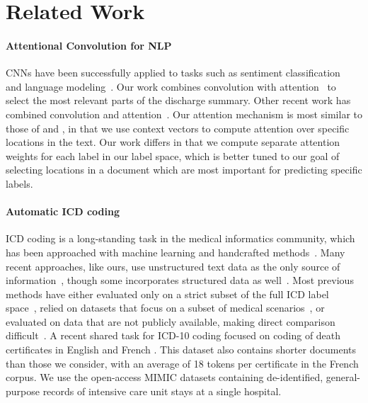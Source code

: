\documentclass[11pt,a4paper]{article}
\begin{document}
\section{Related Work}

\paragraph{Attentional Convolution for NLP}

CNNs have been successfully applied to tasks such as sentiment classification~\cite{kim2014convolutional} and language modeling~\cite{dauphin2016language}. Our work combines convolution with attention~\cite{bahdanau2014neural,yang2016hierarchical} to select the most relevant parts of the discharge summary. Other recent work has combined convolution and attention~\cite[e.g.,][]{allamanis2016convolutional,yin2016abcnn,dos2016attentive,yin2017attentive}.
Our attention mechanism is most similar to those of  and , in that we use context vectors to compute attention over specific locations in the text. Our work differs in that we compute separate attention weights for each label in our label space, which is better tuned to our goal of selecting locations in a document which are most important for predicting specific labels.

\paragraph{Automatic ICD coding}
ICD coding is a long-standing task in the medical informatics community, which has been approached with machine learning and handcrafted methods~\cite{scheurwegs2015data}. Many recent approaches, like ours, use unstructured text data as the only source of information~\cite[e.g.,][]{kavuluru2015empirical,subotin2014system}, though some incorporates structured data as well~\cite[e.g.,][]{scheurwegs2017selecting,wang2016diagnosis}. 
Most previous methods have either evaluated only on a strict subset of the full ICD label space~\cite{wang2016diagnosis}, relied on datasets that focus on a subset of medical scenarios~\cite{zhang2017enhancing}, or evaluated on data that are not publicly available, making direct comparison difficult~\cite{subotin2016method}. A recent shared task for ICD-10 coding focused on coding of death certificates in English and French \cite{neveol2017clef}. This dataset also contains shorter documents than those we consider, with an average of 18 tokens per certificate in the French corpus. We use the open-access MIMIC datasets containing de-identified, general-purpose records of intensive care unit stays at a single hospital. 
\end{document}
